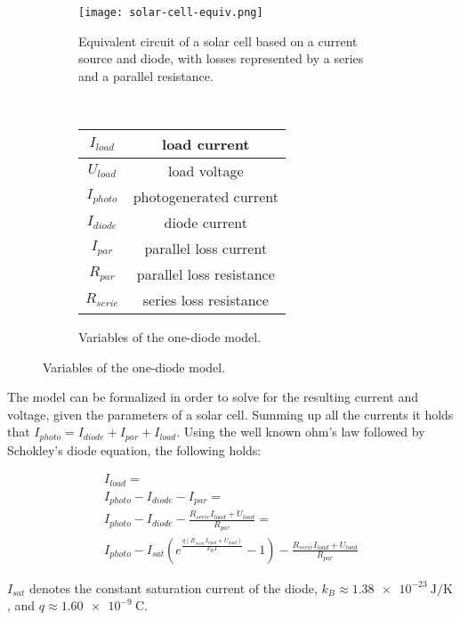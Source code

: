 \begin{figure}[!ht]
\centering
\begin{subfigure}{0.4\textwidth}
  \texttt{[image: solar-cell-equiv.png]}
  \caption[Equivalent circuit of a solar cell]{
    Equivalent circuit of a solar cell based on a current source and diode,
    with losses represented by a series and a parallel resistance.
  }
  \label{fig:solar-cell-equiv}
\end{subfigure}
~
\begin{subfigure}{0.4\textwidth}
  \begin{tabular}[b]{| c | c |}
  \hline
  $I_{load}$ & load current \\ \hline
  $U_{load}$ & load voltage\\ \hline
  $I_{photo}$ & photogenerated current \\ \hline
  $I_{diode}$ & diode current \\ \hline
  $I_{par}$ & parallel loss current \\ \hline
  $R_{par}$ & parallel loss resistance \\ \hline
  $R_{serie}$ & series loss resistance \\ \hline
  \end{tabular}
  \caption[solar-cell-variables]{Variables of the one-diode model.}
  \label{fig:one-diode-model-vars}
\end{subfigure}
\end{figure}

The model can be formalized in order to solve for the resulting current and voltage, given the parameters of a solar cell.
Summing up all the currents it holds that $I_{photo} = I_{diode} + I_{par} + I_{load}$.
Using the well known ohm's law followed by Schokley's diode equation\cite{Walker2001}, the following holds:

\begin{multline}
\label{eq:eq-circuit}
I_{load} = \\
I_{photo} - I_{diode} - I_{par} = \\
I_{photo} - I_{diode} - \frac{R_{serie}I_{load} + U_{load}}{R_{par}} = \\
I_{photo} - I_{sat}(e^\frac{q(R_{serie}I_{load} + U_{load})}{k_B T} - 1) - \frac{R_{serie}I_{load} + U_{load}}{R_{par}}
\end{multline}

$I_{sat}$ denotes the constant saturation current of the diode,
$k_B \approx \SI{1.38e-23}{\joule\per\kelvin}$,
and $q \approx \SI{1.60e-9}{\coulomb}$.

